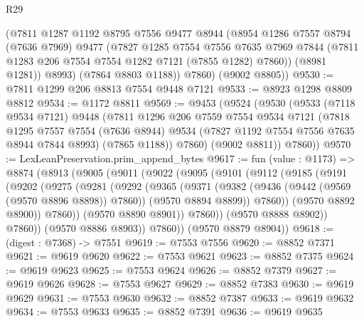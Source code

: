 \begin{lexlean}{R29}
\begin{coremodule}
          (@7811
            @1287
            @1192
            @8795
            @7556
            @9477
            @8944
            (@8954
              @1286
              @7557
              @8794
              (@7636 @7969)
              @9477
              (@7827
                @1285
                @7554
                @7556
                @7635
                @7969
                @7844
                (@7811 @1283 @206 @7554 @7554 @1282 @7121 (@7855 @1282) @7860))
              (@8981 @1281))
            @8993)
          (@7864 @8803 @1188))
        @7860)
      (@9002 @8805))
@9530 := @7811 @1299 @206 @8813 @7554 @9448 @7121
@9533 := @8923 @1298 @8809 @8812
@9534 := @1172 @8811
@9569 := @9453
    (@9524
      (@9530
        (@9533
          (@7118 @9534 @7121)
          @9448
          (@7811
            @1296
            @206
            @7559
            @7554
            @9534
            @7121
            (@7818
              @1295
              @7557
              @7554
              (@7636 @8944)
              @9534
              (@7827 @1192 @7554 @7556 @7635 @8944 @7844 @8993)
              (@7865 @1188))
            @7860)
          (@9002 @8811))
        @7860))
@9570 := LexLeanPreservation.prim_append_bytes
@9617 := fun (value : @1173) =>
  @8874
    (@8913
      (@9005
        (@9011
          (@9022
            (@9095
              (@9101
                (@9112
                  (@9185
                    (@9191
                      (@9202
                        (@9275
                          (@9281
                            (@9292
                              (@9365
                                (@9371
                                  (@9382
                                    (@9436 (@9442 (@9569 (@9570 @8896 @8898)) @7860))
                                    (@9570 @8894 @8899))
                                  @7860))
                              (@9570 @8892 @8900))
                            @7860))
                        (@9570 @8890 @8901))
                      @7860))
                  (@9570 @8888 @8902))
                @7860))
            (@9570 @8886 @8903))
          @7860))
      (@9570 @8879 @8904))
@9618 := (digest : @7368) -> @7551
@9619 := @7553 @7556
@9620 := @8852 @7371
@9621 := @9619 @9620
@9622 := @7553 @9621
@9623 := @8852 @7375
@9624 := @9619 @9623
@9625 := @7553 @9624
@9626 := @8852 @7379
@9627 := @9619 @9626
@9628 := @7553 @9627
@9629 := @8852 @7383
@9630 := @9619 @9629
@9631 := @7553 @9630
@9632 := @8852 @7387
@9633 := @9619 @9632
@9634 := @7553 @9633
@9635 := @8852 @7391
@9636 := @9619 @9635

\end{coremodule}
\end{lexlean}
